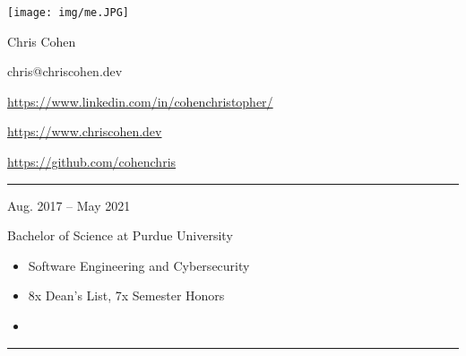 \documentclass[a4paper]{article}
\newlength{\cvcolumngapwidth}
\newlength{\cvleftcolumnwidth}
\newlength{\cvrightcolumnwidth}
\newcommand{\cvnamestyle}[1]{{\Huge\cvnamefont\textcolor{cvnamecolor}{#1}}}
\newcommand{\cvsectionstyle}[1]{{\normalsize\cvsectionfont\textcolor{cvsectioncolor}{#1}}}
\newcommand{\cvtitlestyle}[1]{{\large\cvtitlefont\textcolor{cvtitlecolor}{#1}}}
\newcommand{\cvdurationstyle}[1]{{\small\cvdurationfont\textcolor{cvdurationcolor}{#1}}}
\newlength{\cvafteritemskipamount}
\newlength{\cvaftersectionskipamount}
\newlength{\cvafternameskipamount}
\newlength{\cvafterpersonalinfolineskipamount}
\newlength{\cvaftertitleskipamount}
\newlength{\cvparskip}
\newcommand{\cvpersonalinfo}[2]{
    \begin{minipage}[t]{\cvleftcolumnwidth}
        \vspace{0mm} %
        \raggedleft #1
    \end{minipage}%
    \hspace{\cvcolumngapwidth}%
    \begin{minipage}[t]{\cvrightcolumnwidth}
        \vspace{0mm} %
        #2
    \end{minipage}

    \vspace{\cvafteritemskipamount}
}
\newcommand{\cvname}[1]{
    \cvnamestyle{#1}

    \vspace{\cvafternameskipamount}
}
\newcommand{\cvpersonalinfolinewithicon}[3]{
    \raisebox{.5\fontcharht\font`E-.5\height}{\texttt{[image: \#2]}}
    #3

    \vspace{\cvafterpersonalinfolineskipamount}
}
\newcommand{\cvsection}[1]{
    \begin{minipage}[t]{\cvleftcolumnwidth}
        \raggedleft\cvsectionstyle{#1}
    \end{minipage}%
    \hspace{\cvcolumngapwidth}%
    \begin{minipage}[t]{\cvrightcolumnwidth}
        \textcolor{cvrulecolor}{\rule{\cvrightcolumnwidth}{0.3mm}}
    \end{minipage}

    \vspace{\cvaftersectionskipamount}
}
\newcommand{\cvitem}[2]{
    \begin{minipage}[t]{\cvleftcolumnwidth}
        \raggedleft #1
    \end{minipage}%
    \hspace{\cvcolumngapwidth}%
    \begin{minipage}[t]{\cvrightcolumnwidth}
        \setlength{\parskip}{\cvparskip} #2
    \end{minipage}

    \vspace{\cvafteritemskipamount}
}
\newcommand{\cvtitle}[1]{
    \cvtitlestyle{#1}

    \vspace{\cvaftertitleskipamount}
    \vspace{-\cvparskip}
}
\begin{document}

\cvpersonalinfo{
    \texttt{[image: img/me.JPG]}
}{
    \cvname{\textcolor{emphasiscolor}{Chris Cohen}}


    \cvpersonalinfolinewithicon{height=4mm}{img/email.png}{
      chris@chriscohen.dev
    }

    \cvpersonalinfolinewithicon{height=4mm}{img/linkedin.png}{
      \href{https://www.linkedin.com/in/cohenchristopher/}{https://www.linkedin.com/in/cohenchristopher/}
    }

    \cvpersonalinfolinewithicon{height=4mm}{img/website.png}{
      \href{https://www.chriscohen.dev}{https://www.chriscohen.dev}
    }

    \cvpersonalinfolinewithicon{height=4mm}{img/github.png}{
      \href{https://github.com/cohenchris}{https://github.com/cohenchris}
    }
}


\cvsection{\LARGE \textcolor{emphasiscolor}{EDUCATION}}
\vspace{5mm}

\cvitem{
    \cvdurationstyle{Aug. 2017 -- May 2021}
}{
  \cvtitle{Bachelor of Science at Purdue University}


    \begin{itemize}[leftmargin=*]
      \item Software Engineering and Cybersecurity
      \item 8x Dean's List, 7x Semester Honors
      \item \large{\regularfont{\textcolor{emphasiscolor}{3.83 GPA}}}
    \end{itemize}
    \vspace{5mm}
}


\cvsection{\LARGE \textcolor{emphasiscolor}{EMPLOYMENT}}
\vspace{5mm}
\end{document}
